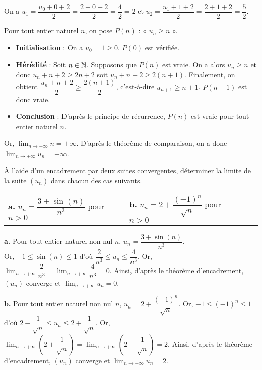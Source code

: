 \documentclass[11pt,fleqn, openany]{book} %
\begin{document}
\begin{solution}
On a $u_1=\dfrac{u_0+0+2}{2}=\dfrac{2+0+2}{2}=\dfrac{4}{2}=2$ et $u_2=\dfrac{u_1+1+2}{2}=\dfrac{2+1+2}{2}=\dfrac{5}{2}$.

Pour tout entier naturel $n$, on pose $P(n)$ : « $u_n \geqslant n$ ».

\begin{itemize}
\item \textbf{Initialisation} : On a $u_0=1 \geqslant 0$. $P(0)$ est vérifiée.
\item \textbf{Hérédité} : Soit $n\in\mathbb{N}$. Supposons que $P(n)$ est vraie. On a alors $u_n \geqslant n$ et donc $u_n + n + 2 \geqslant 2n+2$ soit $u_n+n+2 \geqslant 2(n+1)$. Finalement, on obtient $\dfrac{u_n+n+2}{2} \geqslant \dfrac{2(n+1)}{2}$, c'est-à-dire $u_{n+1}\geqslant n+1$. $P(n+1)$ est donc vraie.
\item \textbf{Conclusion} : D'après le principe de récurrence, $P(n)$ est vraie pour tout entier naturel $n$.
\end{itemize}

Or, $\displaystyle\lim_{n\to+\infty}n=+\infty$. D'après le théorème de comparaison, on a donc $\displaystyle\lim_{n\to+ \infty}u_n=+\infty$.
\newpage
\end{solution}


\begin{exercise} À l'aide d'un encadrement par deux suites convergentes, déterminer la limite de la suite $(u_n)$ dans chacun des cas suivants.

\begin{center}
\begin{tabularx}{\linewidth}{XXXX}
\textbf{a.} $ u_n = \dfrac{3+\sin(n)}{n^3}$ pour $n>0$ & \textbf{b.} $u_n=2+\dfrac{(-1)^n}{\sqrt{n}}$ pour $n>0$ \\

\end{tabularx}
\end{center}\end{exercise}

\begin{solution}\textbf{a.} Pour tout entier naturel non nul $n$, $u_n=\dfrac{3+\sin(n)}{n^3}$.\\ Or, $-1 \leqslant \sin(n) \leqslant 1$ d'où $\dfrac{2}{n^3} \leqslant u_n \leqslant \dfrac{4}{n^3}$. Or, $\displaystyle \lim_{n \to +\infty} \dfrac{2}{n^3}=\displaystyle \lim_{n \to +\infty}\dfrac{4}{n^3}=0$. Ainsi, d'après le théorème d'encadrement, $(u_n)$ converge et $\displaystyle \lim_{n \to +\infty}u_n=0$.

\textbf{b.} Pour tout entier naturel non nul $n$, $u_n=2+\dfrac{(-1)^n}{\sqrt{n}}$. Or, $-1 \leqslant (-1)^n \leqslant 1$ d'où $2-\dfrac{1}{\sqrt{n}} \leqslant u_n \leqslant 2+\dfrac{1}{\sqrt{n}}$. Or, $\displaystyle \lim_{n \to +\infty}\left( 2+\dfrac{1}{\sqrt{n}}\right)=\displaystyle \lim_{n \to +\infty}\left( 2-\dfrac{1}{\sqrt{n}}\right)=2$. Ainsi, d'après le théorème d'encadrement, $(u_n)$ converge et $\displaystyle \lim_{n \to +\infty}u_n=2$.\end{solution}
\end{document}
